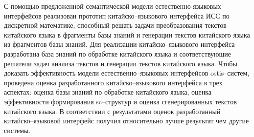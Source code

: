 С помощью предложенной семантической модели естественно-языковых интерфейсов реализован прототип китайско–языкового интерфейса ИСС по дискретной математике, способный решать задачи преобразования текстов китайского языка в фрагменты базы знаний и генерации текстов китайского языка из фрагментов базы знаний. Для реализации китайско–языкового интерфейса разработана база знаний по обработке китайского языка и соответствующие решатели задач анализа текстов и генерации текстов китайского языка. Чтобы доказать эффективность модели естественно–языковых интерфейсов ostis–систем, проведена оценка разработанного китайско–языкового интерфейса в трех аспектах: оценка базы знаний по обработке китайского языка, оценка эффективности формирования sc–структур и оценка сгенерированных текстов китайского языка. В соответствии с результатами оценок разработанный китайско–языковой интерфейс получил относительно лучше результат чем другие системы.
%